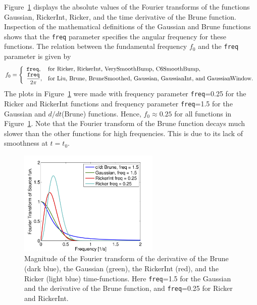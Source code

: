 \documentclass[11pt]{report}
\begin{document}
Figure~\ref{fig:fouriers} displays the absolute values of the Fourier transforms of the
functions Gaussian, RickerInt, Ricker, and the time derivative of the Brune
function. Inspection of the mathematical definitions of the Gaussian and Brune functions
shows that the {\tt freq} parameter specifies the angular frequency for these
functions. The relation between the fundamental frequency $f_0$ and the {\tt freq} parameter is
given by
\begin{equation}\label{eq:angular-scaling}
f_0 = \left\{ \begin{array}{ll}
 {\tt freq},& \mbox{for Ricker, RickerInt, VerySmoothBump, C6SmoothBump},\\
 \dfrac{\tt freq}{2\pi},& \mbox{for Liu, Brune, BruneSmoothed, Gaussian, GaussianInt, and GaussianWindow}.
\end{array}\right.
\end{equation}
The plots in Figure~\ref{fig:fouriers} were made with frequency parameter {\tt freq}=0.25 for the
Ricker and RickerInt functions and frequency parameter {\tt freq}=1.5 for the Gaussian and
$d/dt$(Brune) functions. Hence, $f_0\approx 0.25$ for all functions in
Figure~\ref{fig:fouriers}. Note that the Fourier
transform of the Brune function decays much slower than the other functions for high
frequencies. This is due to its lack of smoothness at $t=t_0$.
\begin{figure}
\begin{center}
\includegraphics[width=0.6\textwidth]{figfouriers.png}
\caption{ Magnitude of the Fourier transform of the derivative of the Brune (dark
  blue), the Gaussian (green), the RickerInt (red), and the Ricker (light blue)
  time-functions. Here {\tt freq}=1.5 for the Gaussian and the derivative of the Brune
  function, and {\tt freq}=0.25 for Ricker and RickerInt.}
\label{fig:fouriers}
\end{center}
\end{figure}
\end{document}
